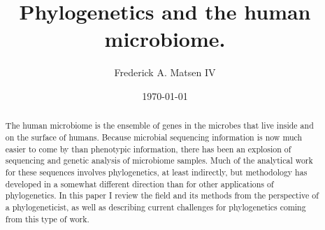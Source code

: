 \documentclass{amsart}
\newcommand{\forarxiv}[1]{#1}
\newcommand{\notforarxiv}[1]{}
\begin{document}
\notforarxiv{
\begin{flushright}
Version dated: \today
\end{flushright}
\bigskip
\noindent RH: PHYLOGENETICS AND THE HUMAN MICROBIOME
\bigskip
\medskip
\begin{center}

\noindent{\Large \bf Phylogenetics and the human microbiome.}
\bigskip

\noindent {\normalsize \sc
Frederick A. Matsen IV$^1$}\\
\noindent {\small \it
$^1$
Program in Computational Biology, Fred Hutchinson Cancer Research Center, Seattle, WA, 91802, USA}\\
\end{center}
\medskip
\noindent{\bf Corresponding author:} Frederick A Matsen, Program in Computational Biology, Fred Hutchinson Cancer Research Center, Seattle, WA, 91802, USA; E-mail: matsen@fhcrc.org.\\
\vspace{1in}
}

\forarxiv{\
\title{Phylogenetics and the human microbiome.}
\author{Frederick A. Matsen IV}
\date{\today}
\begin{abstract}
}
\notforarxiv{
\newpage
\section{Abstract}
}

The human microbiome is the ensemble of genes in the microbes that live inside and on the surface of humans.
Because microbial sequencing information is now much easier to come by than phenotypic information, there has been an explosion of sequencing and genetic analysis of microbiome samples.
Much of the analytical work for these sequences involves phylogenetics, at least indirectly, but methodology has developed in a somewhat different direction than for other applications of phylogenetics.
In this paper I review the field and its methods from the perspective of a phylogeneticist, as well as describing current challenges for phylogenetics coming from this type of work.

\forarxiv{
\end{abstract}
\maketitle
}

\notforarxiv{
\vspace{4.5in}
\noindent (Keywords: human microbiome; human microbiota; microbial ecology; phylogenetic methods; 16S; metagenome)\\
\newpage
}
\end{document}

